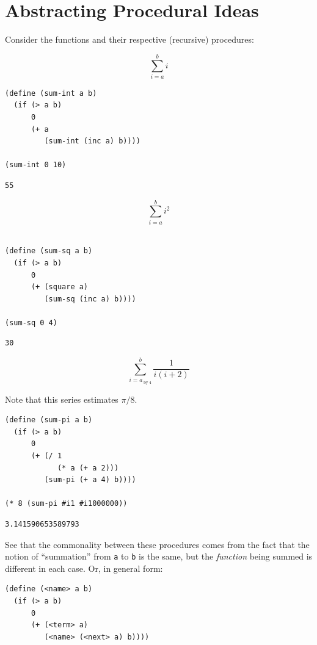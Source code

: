 \documentclass[9pt]{report}
\begin{document}
\section{Abstracting Procedural Ideas}
\label{sec:org00551d1}

Consider the functions and their respective (recursive) procedures:

$$\sum_{i=a}^{b} i$$

\begin{verbatim}
(define (sum-int a b)
  (if (> a b)
      0
      (+ a
         (sum-int (inc a) b))))

(sum-int 0 10)
\end{verbatim}

\begin{verbatim}
55
\end{verbatim}


$$\sum_{i=a}^{b} i^{2}$$

\begin{verbatim}

(define (sum-sq a b)
  (if (> a b)
      0
      (+ (square a)
         (sum-sq (inc a) b))))

(sum-sq 0 4)
\end{verbatim}

\begin{verbatim}
30
\end{verbatim}


$$\sum_{i=a_{\mathrm{~by~}4}}^{b} \frac{1}{i(i+2)}$$

Note that this series estimates \(\pi /8\).

\begin{verbatim}
(define (sum-pi a b)
  (if (> a b)
      0
      (+ (/ 1
            (* a (+ a 2)))
         (sum-pi (+ a 4) b))))

(* 8 (sum-pi #i1 #i1000000))
\end{verbatim}

\begin{verbatim}
3.141590653589793
\end{verbatim}



See that the commonality between these procedures comes from the
fact that the notion of ``summation'' from \texttt{a} to \texttt{b} is the same,
but the \emph{function} being summed is different in each case. Or, in
general form:

\begin{verbatim}
(define (<name> a b)
  (if (> a b)
      0
      (+ (<term> a)
         (<name> (<next> a) b))))
\end{verbatim}
\end{document}

